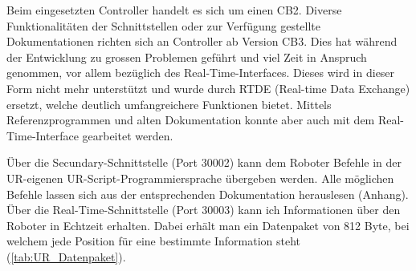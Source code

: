 		\newpage
		
		\begin{bfhNoteBox}
			Beim eingesetzten Controller handelt es sich um einen CB2. Diverse Funktionalitäten der Schnittstellen oder zur Verfügung gestellte Dokumentationen richten sich an Controller ab Version CB3. Dies hat während der Entwicklung zu grossen Problemen geführt und viel Zeit in Anspruch genommen, vor allem bezüglich des Real-Time-Interfaces. Dieses wird in dieser Form nicht mehr unterstützt und wurde durch RTDE (Real-time Data Exchange) ersetzt, welche deutlich umfangreichere Funktionen bietet. Mittels Referenzprogrammen und alten Dokumentation konnte aber auch mit dem Real-Time-Interface gearbeitet werden.
		\end{bfhNoteBox}
		
		Über die Secundary-Schnittstelle (Port 30002) kann dem Roboter Befehle in der UR-eigenen UR-Script-Programmiersprache übergeben werden. Alle möglichen Befehle lassen sich aus der entsprechenden Dokumentation herauslesen (Anhang). 
		\\
		Über die Real-Time-Schnittstelle (Port 30003) kann ich Informationen über den Roboter in Echtzeit erhalten. Dabei erhält man ein Datenpaket von 812 Byte, bei welchem jede Position für eine bestimmte Information steht (\ref{tab:UR_Datenpaket}).
		
